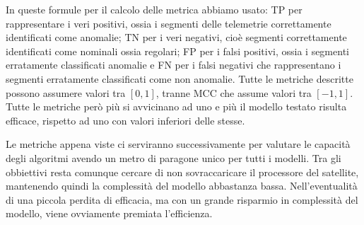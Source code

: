 In queste formule per il calcolo delle metrica abbiamo usato: TP per rappresentare i veri positivi, ossia i segmenti delle telemetrie correttamente identificati come anomalie; TN per i veri negativi, cioè segmenti correttamente identificati come nominali ossia regolari; FP per i falsi positivi, ossia i segmenti erratamente classificati anomalie e FN per i falsi negativi che rappresentano i segmenti erratamente classificati come non anomalie.
Tutte le metriche descritte possono assumere valori tra $[0,1]$, tranne MCC che assume valori tra $[-1,1]$.
Tutte le metriche però più si avvicinano ad uno e più il modello testato risulta efficace, rispetto ad uno con valori inferiori delle stesse.

Le metriche appena viste ci serviranno successivamente per valutare le capacità degli algoritmi avendo un metro di paragone unico per tutti i modelli.
Tra gli obbiettivi resta comunque cercare di non sovraccaricare il processore del satellite, mantenendo quindi la complessità del modello abbastanza bassa.
Nell'eventualità di una piccola perdita di efficacia, ma con un grande risparmio in complessità del modello, viene ovviamente premiata l'efficienza.
